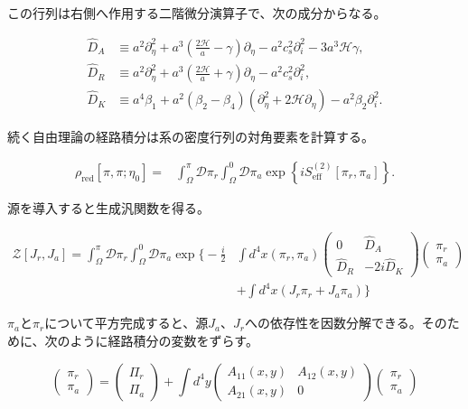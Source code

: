 \documentclass[a4paper,11pt]{ltjsarticle}
\numberwithin{equation}{section}
\def\pia{\pi_{a}}
\def\pir{\pi_{r}}
\begin{document}
この行列は右側へ作用する二階微分演算子で、次の成分からなる。

\begin{align}
\widehat{D}_{A}& \equiv a^2\partial_{\eta}^{2}+ a^3 \left(\frac{2\mathcal{H}}{a}- \gamma\right)\partial_{\eta}-a^2c_{s}^{2} \partial_{i}^{2}- 3a^3 \mathcal{H} \gamma,\\
\widehat{D}_{R}&\equiv a^2\partial_{\eta}^{2}+a^3\left(\frac{2\mathcal{H}}{a}+ \gamma\right)\partial_{\eta}- a^2 c_s^2\partial_{i}^{2},\\
\widehat{D}_{K}&\equiv a^4\beta_{1}+a^2(\beta_{2}-\beta_{4})\left(\partial^{2}_{\eta}+2\mathcal{H}\partial_{\eta}\right)-a^2 \beta_{2}\partial_{i}^{2}.
\end{align}

続く自由理論の経路積分は系の密度行列の対角要素を計算する。

\begin{align}
\rho_{\mathrm{red}}\left[\pi, \pi;\eta_0\right] = &\int_{\Omega}^\pi \mathcal{D}\pir  \int_{\Omega}^{0}\mathcal{D}\pia \exp\left\{i  S_{\text{eff}}^{(2)}[\pir,\pia]\right\}.
\end{align}

源を導入すると生成汎関数を得る。

\begin{align}
\mathcal{Z}[J_{r},J_{a}]=\int_{\Omega}^\pi \mathcal{D}\pir  \int_{\Omega}^{0}\mathcal{D}\pia \exp\Big\{-\frac{i}{2}  &\int d^{4}x \left(\pir,\pia\right)\begin{pmatrix}
0 & \widehat{D}_{A} \\ \widehat{D}_{R} & -2i\widehat{D}_{K}
\end{pmatrix}\begin{pmatrix}
\pir \\ \pia
\end{pmatrix} \nonumber\\
&+\int d^{4}x \left(J_{r}\pir+J_{a}\pia\right)\Big\}
\end{align}

$\pia$と$\pir$について平方完成すると、源$J_a$、$J_r$への依存性を因数分解できる。そのために、次のように経路積分の変数をずらす。

\begin{equation}
\begin{pmatrix}
\pir \\ \pia
\end{pmatrix}=\begin{pmatrix}
\Pi_{r} \\ \Pi_{a}
\end{pmatrix}+\int d^{4}y \begin{pmatrix}
A_{11}(x,y) & A_{12}(x,y) \\  A_{21}(x,y) & 0
\end{pmatrix}\begin{pmatrix}
\pir \\ \pia
\end{pmatrix}
\end{equation}
\end{document}
